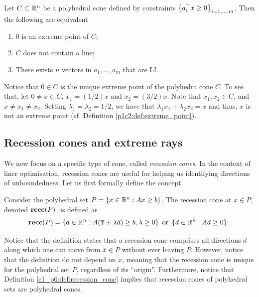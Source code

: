 \begin{corollary} Let $C \subset \mathbb{R}^n$ be a polyhedral cone defined by constraints $\left\{ a_i^\top x \geq 0 \right \}_{i =1,\dots,m}$. Then the following are equivalent
	\begin{enumerate}
		\item $0$ is an extreme point of $C$;
		\item $C$ does not contain a line;
		\item There exists $n$ vectors in $a_1, \dots, a_m$ that are LI.	
	\end{enumerate}
\end{corollary}

Notice that $0 \in C$ is the unique extreme point of the polyhedra cone $C$. To see that, let $0 \neq x \in C$, $x_1 = (1/2) x$ and $x_2 = (3/2)x$. Note that $x_1, x_2 \in C$, and $x \neq x_1 \neq x_2$. Setting $\lambda_1 = \lambda_2 = 1/2$, we have that $\lambda_1x_1  + \lambda_2x_2 = x$ and thus, $x$ is not an extreme point (cf. Definition \ref{p1c2:def:extreme_point}). 


\subsection{Recession cones and extreme rays}

We now focus on a specific type of cone, called \emph{recession cones}. In the context of liner optimisation, recession cones are useful for helping us identifying directions of unboundedness. Let us first formally define the concept.

\begin{definition} \label{c1_p6:def:recession_cone}
	Consider the polyhedral set $P = \left\{ x \in \mathbb{R}^n : Ax \geq b \right \}$. The recession cone at $\overline{x} \in P$, denoted ${\bf recc}(P)$, is defined as
	\begin{equation*}
		{\bf recc}(P) = \left\{ d \in \mathbb{R}^n : A(\overline{x} + \lambda d) \geq b, \lambda \geq 0 \right \} \text{ or } \left\{ d \in \mathbb{R}^n : Ad \geq 0 \right \}. 	
	\end{equation*}
\end{definition}

Notice that the definition states that a recession cone comprises all directions $d$ along which one can move from $\overline{x} \in P$ without ever leaving $P$. However, notice that the definition do not depend on $\overline{x}$, meaning that the recession cone is unique for the polyhedral set $P$, regardless of its ``origin''. Furthermore, notice that Definition \ref{c1_p6:def:recession_cone} implies that recession cones of polyhedral sets are polyhedral cones. 

